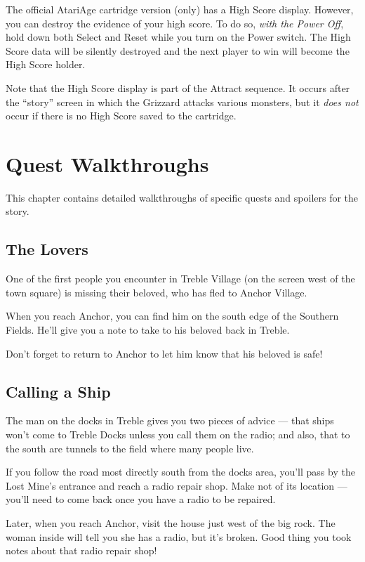\documentclass[10pt,twocolumn]{memoir}
\begin{document}
The official AtariAge cartridge version (only) has a High Score display.
However, you  can destroy  the evidence  of your high  score. To  do so,
\emph{with the  Power Off}, hold  down both  Select and Reset  while you
turn on the Power switch. The High Score data will be silently destroyed
and the next player to win will become the High Score holder.

Note  that the  High  Score display  is part  of  the Attract  sequence.
It  occurs after  the ``story''  screen  in which  the Grizzard  attacks
various monsters, but it \emph{does not} occur if there is no High Score
saved to the cartridge.

\chapter{Quest Walkthroughs}

This  chapter  contains detailed  walkthroughs  of  specific quests  and
spoilers for the story.

\section{The Lovers}

One of the  first people you encounter in Treble  Village (on the screen
west  of the  town square)  is missing  their beloved,  who has  fled to
Anchor Village.

When  you reach  Anchor, you  can  find him  on  the south  edge of  the
Southern  Fields. He'll  give you  a note  to take  to his  beloved back
in Treble.

Don't  forget to  return to  Anchor  to let  him know  that his  beloved
is safe!

\section{Calling a Ship}

The man on the  docks in Treble gives you two pieces  of advice --- that
ships won't come to Treble Docks unless  you call them on the radio; and
also, that to the south are tunnels to the field where many people live.

If you follow  the road most directly south from  the docks area, you'll
pass by the Lost Mine's entrance and reach a radio repair shop. Make not
of its location  --- you'll need to  come back once you have  a radio to
be repaired.

Later, when you reach Anchor, visit the house just west of the big rock.
The  woman inside  will  tell you  she  has a  radio,  but it's  broken.
Good thing you took notes about that radio repair shop!
\end{document}
